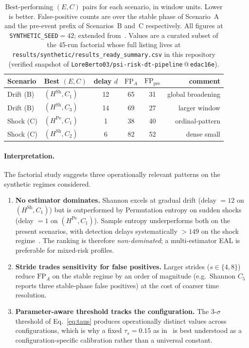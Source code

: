 \documentclass[futureinternet,article,submit,pdftex,moreauthors]{Definitions/mdpi}
\newcommand{\Hsh}{\ensuremath{H^{\mathrm{Sh}}}}
\newcommand{\Hpe}{\ensuremath{H^{\mathrm{Pe}}}}
\newcommand{\taus}{\ensuremath{\tau_{s}}}
\begin{document}
\begin{table}[t]
\centering
\caption{Best-performing $(E, C)$ pairs for each scenario, in window
units. Lower is better. False-positive counts are over the
stable phase of Scenario~A and the pre-event prefix of Scenarios~B
and~C respectively. All figures at \texttt{SYNTHETIC\_SEED}$=42$;
extended from~\cite{berto2026}. Values are a curated subset of the
45-run factorial whose full listing lives at
\texttt{results/synthetic/results\_ready\_summary.csv} in this
repository (verified snapshot of
\texttt{LoreBerto03/psi-risk-dt-pipeline}\,@\,\texttt{edac16e}).}
\label{tab:headline}
\small
\begin{tabular}{@{}llcccr@{}}
\toprule
Scenario & Best $(E, C)$         & delay $d$ & $\mathrm{FP}_A$
                                 & $\mathrm{FP}_{\mathrm{pre}}$
                                 & comment \\
\midrule
Drift (B)  & $(\Hsh, C_1)$ &  12 & 65 & 31 & global broadening \\
Drift (B)  & $(\Hsh, C_3)$ &  14 & 69 & 27 & larger window \\
Shock (C)  & $(\Hpe, C_1)$ &   1 & 38 & 40 & ordinal-pattern \\
Shock (C)  & $(\Hsh, C_2)$ &   6 & 82 & 52 & dense small \\
\bottomrule
\end{tabular}
\end{table}

\paragraph{Interpretation.} The factorial study suggests three
operationally relevant patterns on the synthetic regimes considered.

\begin{enumerate}[leftmargin=*]
  \item \textbf{No estimator dominates.} Shannon excels at gradual
        drift (delay $=12$ on $(\Hsh, C_1)$) but is outperformed by
        Permutation entropy on sudden shocks (delay $=1$ on
        $(\Hpe, C_1)$). Sample entropy underperforms both on the present
        scenarios, with detection delays systematically $> 149$ on the
        shock regime~\cite{berto2026}. The ranking is therefore
        \emph{non-dominated}; a multi-estimator EAL is preferable for
        mixed-risk profiles.
  \item \textbf{Stride trades sensitivity for false positives.} Larger
        strides ($s \in \{4,8\}$) reduce $\mathrm{FP}_A$ on the stable
        regime by an order of magnitude (e.g.\ Shannon $C_5$ reports
        three stable-phase false positives) at the cost of coarser
        time resolution.
  \item \textbf{Parameter-aware threshold tracks the configuration.}
        The 3-$\sigma$ threshold of Eq.~\eqref{eq:taus} produces
        operationally distinct values across configurations, which is
        why a fixed $\taus = 0.15$ as in~\cite{paper3} is best
        understood as a configuration-specific calibration rather than a
        universal constant.
\end{enumerate}
\end{document}
